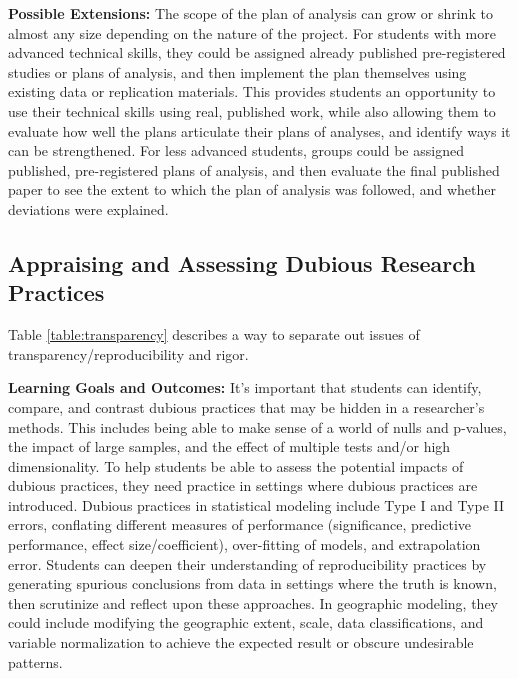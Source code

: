 \documentclass[
  12pt]{article}
\begin{document}
\textbf{Possible Extensions:}
The scope of the plan of analysis can grow or shrink to almost any size depending on the nature of the project. 
For students with more advanced technical skills, they could be assigned already published pre-registered studies or plans of analysis, and then implement the plan themselves using existing data or replication materials. 
This provides students an opportunity to use their technical skills using real, published work, while also allowing them to evaluate how well the plans articulate their plans of analyses, and identify ways it can be strengthened. 
For less advanced students, groups could be assigned published, pre-registered plans of analysis, and then evaluate the final published paper to see the extent to which the plan of analysis was followed, and whether deviations were explained.  

\subsection{Appraising and Assessing Dubious Research Practices} \label{sec-dubious}




Table \ref{table:transparency} describes a way to separate out issues of transparency/reproducibility and rigor.

\textbf{Learning Goals and Outcomes:}
It's important that students can identify, compare, and contrast dubious practices that may be hidden in a researcher’s methods.
This includes being able to make sense of a world of nulls and p-values, the impact of large samples, and the effect of multiple tests and/or high dimensionality.
To help students be able to assess the potential impacts of dubious practices, they need practice in settings where dubious practices are introduced.
Dubious practices in statistical modeling include Type I and Type II errors, conflating different measures of performance (significance, predictive performance, effect size/coefficient), over-fitting of models, and extrapolation error.
Students can deepen their understanding of reproducibility practices by generating spurious conclusions from data in settings where the truth is known, then scrutinize and reflect upon these approaches.
In geographic modeling, they could include modifying the geographic extent, scale, data classifications, and variable normalization to achieve the expected result or obscure undesirable patterns.
\end{document}
